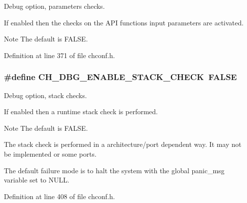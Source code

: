 Debug option, parameters checks. 

If enabled then the checks on the A\+P\+I functions input parameters are activated.

\begin{DoxyNote}{Note}
The default is {\ttfamily F\+A\+L\+S\+E}. 
\end{DoxyNote}


Definition at line 371 of file chconf.\+h.

\hypertarget{group__config_gab93d9ee904f15d4f2c26ef2a1394a1d7}{}
\subsubsection[{C\+H\+\_\+\+D\+B\+G\+\_\+\+E\+N\+A\+B\+L\+E\+\_\+\+S\+T\+A\+C\+K\+\_\+\+C\+H\+E\+C\+K}]{\setlength{\rightskip}{0pt plus 5cm}\#define C\+H\+\_\+\+D\+B\+G\+\_\+\+E\+N\+A\+B\+L\+E\+\_\+\+S\+T\+A\+C\+K\+\_\+\+C\+H\+E\+C\+K~F\+A\+L\+S\+E}\label{group__config_gab93d9ee904f15d4f2c26ef2a1394a1d7}


Debug option, stack checks. 

If enabled then a runtime stack check is performed.

\begin{DoxyNote}{Note}
The default is {\ttfamily F\+A\+L\+S\+E}. 

The stack check is performed in a architecture/port dependent way. It may not be implemented or some ports. 

The default failure mode is to halt the system with the global {\ttfamily panic\+\_\+msg} variable set to {\ttfamily N\+U\+L\+L}. 
\end{DoxyNote}


Definition at line 408 of file chconf.\+h.

\hypertarget{group__config_ga8bc4cfd861131aeb3c880347d0068229}{}
